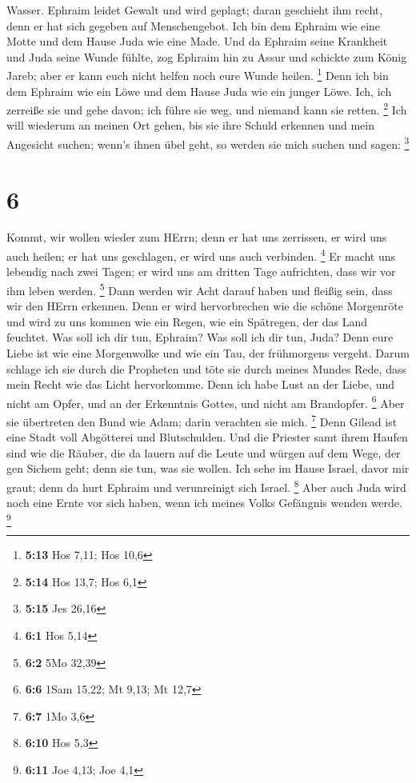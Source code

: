 Wasser.  Ephraim leidet Gewalt und wird geplagt; daran
geschieht ihm recht, denn er hat sich gegeben auf Menschengebot.
 Ich bin dem Ephraim wie eine Motte und dem Hause Juda wie
eine Made.  Und da Ephraim seine Krankheit und Juda seine
Wunde fühlte, zog Ephraim hin zu Assur und schickte zum König Jareb;
aber er kann euch nicht helfen noch eure Wunde heilen. \footnote{\textbf{5:13}
  Hos 7,11; Hos 10,6}  Denn ich bin dem Ephraim wie ein
Löwe und dem Hause Juda wie ein junger Löwe. Ich, ich zerreiße sie und
gehe davon; ich führe sie weg, und niemand kann sie retten. \footnote{\textbf{5:14}
  Hos 13,7; Hos 6,1}  Ich will wiederum an meinen Ort
gehen, bis sie ihre Schuld erkennen und mein Angesicht suchen; wenn's
ihnen übel geht, so werden sie mich suchen und sagen: \footnote{\textbf{5:15}
  Jes 26,16}

\hypertarget{section-2}{%
\section{6}\label{section-2}}

 Kommt, wir wollen wieder zum HErrn; denn er hat uns
zerrissen, er wird uns auch heilen; er hat uns geschlagen, er wird uns
auch verbinden. \footnote{\textbf{6:1} Hos 5,14}  Er macht
uns lebendig nach zwei Tagen; er wird uns am dritten Tage aufrichten,
dass wir vor ihm leben werden. \footnote{\textbf{6:2} 5Mo 32,39}
 Dann werden wir Acht darauf haben und fleißig sein, dass
wir den HErrn erkennen. Denn er wird hervorbrechen wie die schöne
Morgenröte und wird zu uns kommen wie ein Regen, wie ein Spätregen, der
das Land feuchtet.  Was soll ich dir tun, Ephraim? Was soll
ich dir tun, Juda? Denn eure Liebe ist wie eine Morgenwolke und wie ein
Tau, der frühmorgens vergeht.  Darum schlage ich sie durch
die Propheten und töte sie durch meines Mundes Rede, dass mein Recht wie
das Licht hervorkomme.  Denn ich habe Lust an der Liebe, und
nicht am Opfer, und an der Erkenntnis Gottes, und nicht am Brandopfer.
\footnote{\textbf{6:6} 1Sam 15,22; Mt 9,13; Mt 12,7}  Aber
sie übertreten den Bund wie Adam; darin verachten sie mich. \footnote{\textbf{6:7}
  1Mo 3,6}  Denn Gilead ist eine Stadt voll Abgötterei und
Blutschulden.  Und die Priester samt ihrem Haufen sind wie
die Räuber, die da lauern auf die Leute und würgen auf dem Wege, der gen
Sichem geht; denn sie tun, was sie wollen.  Ich sehe im
Hause Israel, davor mir graut; denn da hurt Ephraim und verunreinigt
sich Israel. \footnote{\textbf{6:10} Hos 5,3}  Aber auch
Juda wird noch eine Ernte vor sich haben, wenn ich meines Volks
Gefängnis wenden werde. \footnote{\textbf{6:11} Joe 4,13; Joe 4,1}

